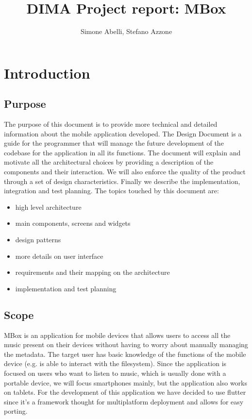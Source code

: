 \documentclass{article}
\author{Simone Abelli, Stefano Azzone}
\title{DIMA Project report: MBox}
\begin{document}
\maketitle
\newpage
\tableofcontents
\newpage
\section{Introduction}
\subsection{Purpose}
The purpose of this document is to provide more technical and detailed
information about the mobile application developed. The Design Document is a
guide for the programmer that will manage the future development of the codebase
for the application in all its functions. The document will explain and motivate
all the architectural choices by providing a description of the components and
their interaction. We will also enforce the quality of the product through a set
of design characteristics. Finally we describe the implementation, integration
and test planning.
The topics touched by this document are:
\begin{itemize}
	\item high level architecture
	\item main components, screens and widgets
	\item design patterns
	\item more details on user interface
	\item requirements and their mapping on the architecture
	\item implementation and test planning
\end{itemize}

\subsection{Scope}
MBox is an application for mobile devices that allows users to access all the
music present on their devices without having to worry about manually managing
the metadata. The target user has basic knowledge of the functions of the mobile
device (e.g. is able to interact with the filesystem). Since the application is
focused on users who want to listen to music, which is usually done with a
portable device, we will focus smartphones mainly, but the application also
works on tablets. For the development of this application we have decided to use
flutter since it's a framework thought for multiplatform deployment and allows
for easy porting.
\end{document}
